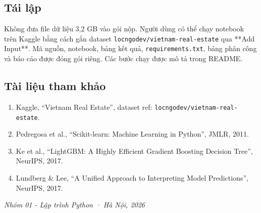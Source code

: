 \documentclass[11pt,a4paper]{article}
\begin{document}
\subsection{Tái lập}
Không đưa file dữ liệu 3,2 GB vào gói nộp. Người dùng có thể chạy notebook trên Kaggle bằng cách gắn dataset \texttt{locngodev/vietnam-real-estate} qua **Add Input**. Mã nguồn, notebook, bảng kết quả, \texttt{requirements.txt}, bảng phân công và báo cáo được đóng gói riêng. Các bước chạy được mô tả trong README.

\subsection{Tài liệu tham khảo}
\begin{enumerate}[leftmargin=1.5em,itemsep=1pt]
\item Kaggle, ``Vietnam Real Estate'', dataset ref: \texttt{locngodev/vietnam-real-estate}.
\item Pedregosa et al., ``Scikit-learn: Machine Learning in Python'', JMLR, 2011.
\item Ke et al., ``LightGBM: A Highly Efficient Gradient Boosting Decision Tree'', NeurIPS, 2017.
\item Lundberg \& Lee, ``A Unified Approach to Interpreting Model Predictions'', NeurIPS, 2017.
\end{enumerate}

\vfill\begin{center}\textit{Nhóm 01 - Lập trình Python · Hà Nội, 2026}\end{center}
\end{document}
